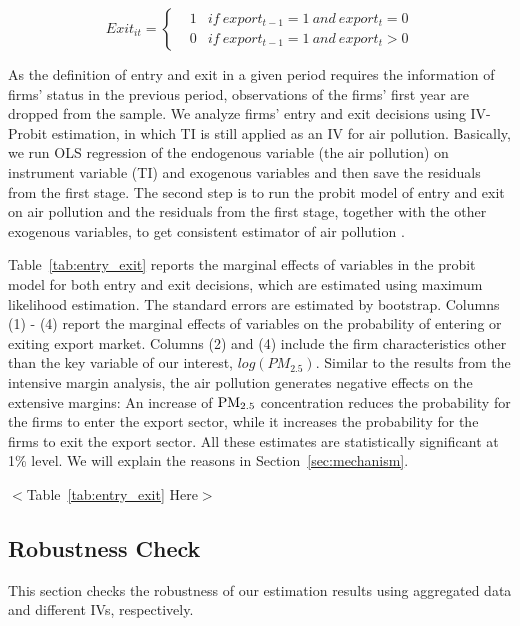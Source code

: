 \documentclass[12pt]{article}
\begin{document}
  \begin{equation}  \label{equ5}
  Exit_{it} = \left\{ \begin{aligned} & 1 & if \ export_{t-1} = 1 \ and \
  export_{t} = 0 \\ & 0 & if \ export_{t-1} = 1 \ and \ export_{t} > 0
  \end{aligned} \right.
  \end{equation}

  As the definition of entry and exit in a given period requires the information of firms' status in the previous period,  observations of the firms' first year are dropped from the sample. We analyze firms' entry and exit decisions using IV-Probit estimation, in which TI is still applied as an IV for air pollution. Basically, we run OLS regression of the endogenous variable (the air pollution) on instrument variable (TI) and exogenous variables and then save the residuals from the first stage. The second step is to run the probit model of entry and exit on air pollution and the residuals from the first stage, together with the other exogenous variables, to get consistent estimator of air pollution \citep{wooldridge2010econometric}. 

 Table~\ref{tab:entry_exit} reports the marginal effects of variables in the probit model for both entry and exit decisions, which are estimated using maximum likelihood estimation. The standard errors are estimated by bootstrap. Columns (1) - (4) report the marginal effects of variables on the probability of entering or exiting export market. Columns (2) and (4) include the firm characteristics other than the key variable of our interest, $log( PM_{2.5})$. Similar to the results from the intensive margin analysis, the air pollution generates negative effects on the extensive margins: An increase of $\rm PM_{2.5}$ concentration reduces the probability for the firms to enter the export sector, while it increases the probability for the firms to exit the export sector. All these estimates are statistically significant at 1\% level. We will explain the reasons in Section~\ref{sec:mechanism}. 

 \begin{center}
  $<$Table~\ref{tab:entry_exit} Here$>$
  \end{center}

\subsection{Robustness Check}
This section checks the robustness of our estimation results using aggregated data and different IVs, respectively. 
\end{document}
